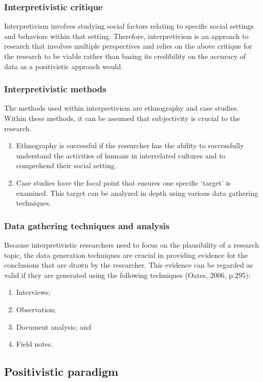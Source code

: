 \subsubsection{Interpretivistic critique}
Interpretivism involves studying social factors relating to specific social settings and behaviors within that setting. Therefore, interpretivism is an approach to research that involves multiple perspectives and relies on the above critique for the research to be viable rather than basing its credibility on the accuracy of data as a positivistic approach would.
\subsubsection{Interpretivistic methods}
The methods used within interpretivism are ethnography and case studies. Within these methods, it can be assumed that subjectivity is crucial to the research. 
\begin{enumerate}[label=\roman*.]
	\item Ethnography is successful if the researcher has the ability to successfully understand the activities of humans in interrelated cultures and to comprehend their social setting.
	\item Case studies have the focal point that ensures one specific ‘target’ is examined. This target can be analyzed in depth using various data gathering techniques.
\end{enumerate}

\subsubsection{Data gathering techniques and analysis}
Because interpretivistic researchers need to focus on the plausibility of a research topic, the data generation techniques are crucial in providing evidence for the conclusions that are drawn by the researcher. This evidence can be regarded as valid if they are generated using the following techniques (Oates, 2006, p.295):
\begin{enumerate}[label=\roman*.]
	\item Interviews;
	\item Observation;
	\item Document analysis; and
	\item Field notes.
\end{enumerate}

\subsection{Positivistic paradigm}
